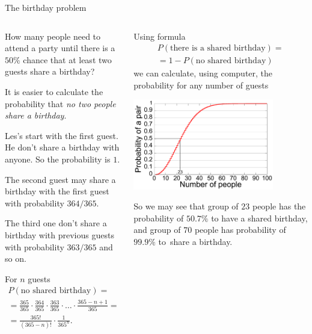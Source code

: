 \documentclass[9pt,aspectratio=169]{beamer}
\begin{document}
\begin{frame}{The birthday problem}
  \begin{columns}[T]
    \begin{column}{0.5\textwidth}
      \begin{problem}
        How many people need to attend a party until there is a $50\%$ chance that at least two guests share a birthday?
      \end{problem}
      It is easier to calculate the probability that \emph{no two people share a birthday}. 
      
      Les's start with the first guest. He don't share a birthday with anyone. So the probability is $1$.
      
      The second guest may share a birthday with the first guest with probability $364/365$. 
      
      The third one don't share a birthday with previous guests with probability $363/365$ and so on. 
      
      For $n$ guests
      \begin{multline*}
        P(\text{no shared birthday}) = \\
        = \frac{365}{365} \cdot \frac{364}{365} \cdot \frac{363}{365} \cdot \ldots \cdot \frac{365 - n + 1}{365} = \\ = \frac{365!}{(365-n)!} \cdot \frac{1}{365^n}.
      \end{multline*}
    \end{column}
    \begin{column}{0.5\textwidth}
      Using formula 
      \begin{multline*}
         P(\text{there is a shared birthday}) = \\ 
         = 1 - P(\text{no shared birthday})
      \end{multline*}
      we can calculate, using computer, the probability for any number of guests
      \begin{center}
        \vspace*{-1ex}   
        \includegraphics[width = 0.80\textwidth]{03 - Probability/Birthday_Paradox.pdf}
        \vspace*{-1ex}   
      \end{center} 
      So we may see that group of $23$ people has the probability of $50.7\%$ to have a shared birthday, and group of $70$ people has probability of $99.9\%$ to~share a birthday.
    \end{column}
  \end{columns}
\end{frame}
\end{document}
